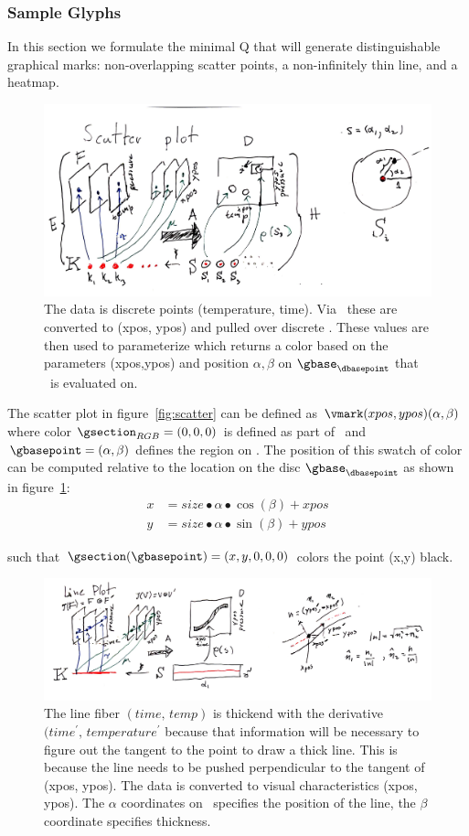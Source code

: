 \documentclass[../main.tex]{subfiles}
\begin{document}
\subsubsection{Sample Glyphs \vmark}
In this section we formulate the minimal Q that will generate distinguishable graphical marks: non-overlapping scatter points, a non-infinitely thin line, and a heatmap. 
\begin{figure}[H]
    \includegraphics[width=.75\textwidth]{figures/math/scatter.png}
    \caption{The data is discrete points (temperature, time). Via \vchannel\ these are converted to (xpos, ypos) and pulled over discrete \gbase. These values are then used to parameterize \gsection which returns a color based on the parameters (xpos,ypos) and position $\alpha, \beta$ on $\gbase_{\dbasepoint}$ that \gsection\ is evaluated on. 
    }
    \label{fig:artist_scatter}
\end{figure}
The scatter plot in figure~\ref{fig:scatter} can be defined as $\vmark(xpos, ypos)(\alpha, \beta)$ where color $\gsection_{RGB} = (0,0,0)$ is defined as part of \vmark\ and $\gbasepoint=(\alpha, \beta)$ defines the region on \gbase. The position of this swatch of color can be computed relative to the location on the disc $\gbase_{\dbasepoint}$ as shown in figure~\ref{fig:artist_scatter}:
\begin{align}
x &= size\bullet \alpha \bullet \cos(\beta) + xpos\\
y &= size\bullet \alpha \bullet \sin(\beta) + ypos
\end{align}

such that $\gsection(\gbasepoint) = (x, y, 0, 0, 0)$ colors the point (x,y) black.
\begin{figure}[H]
    \includegraphics[width=.75\textwidth]{figures/math/line.png}
    \caption{The line fiber $(time,\, temp)$ is thickend with the derivative $(time^{\prime},\, temperature^{\prime}$ because that information will be necessary to figure out the tangent to the point to draw a thick line. This is because the line needs to be pushed perpendicular to the tangent of (xpos, ypos).  The data is converted to visual characteristics (xpos, ypos). The $\alpha$ coordinates on \gbase\ specifies the position of the line, the $\beta$ coordinate specifies thickness.}
    \label{fig:artist_line}
\end{figure}
\end{document}
